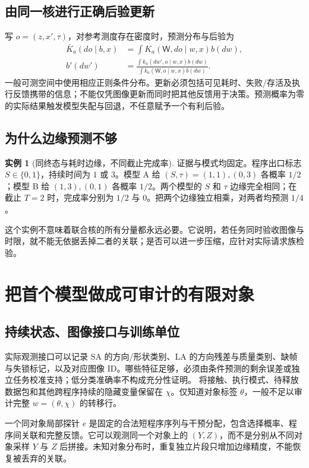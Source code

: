 \documentclass[11pt,a4paper,fontset=fandol]{ctexart}
\theoremstyle{definition}
\newtheorem{example}[theorem]{实例}
\theoremstyle{remark}
\numberwithin{equation}{section}
\begin{document}
\subsection{由同一核进行正确后验更新}
写 $o=(z,x',\tau)$，对参考测度存在密度时，预测分布与后验为
\begin{align}
 \bar K_a(do\mid b,x)&=\int K_a(\mathsf W,do\mid w,x)b(dw),\label{eq:predictive}\\
 b'(dw')&=\frac{\int k_a(dw',o\mid w,x)b(dw)}{\int k_a(\mathsf W,o\mid w,x)b(dw)}.
 \label{eq:bayes}
\end{align}
一般可测空间中使用相应正则条件分布。更新必须包括可见耗时、失败/存活及执行反馈携带的信息；不能仅凭图像更新而同时把其他反馈用于决策。预测概率为零的实际结果触发模型失配与回退，不任意赋予一个有利后验。

\subsection{为什么边缘预测不够}
\begin{example}[同终态与耗时边缘，不同截止完成率]
\label{ex:marginal}
证据与模式均固定。程序出口标志 $S\in\{0,1\}$，持续时间为 $1$ 或 $3$。模型 A 给 $(S,\tau)=(1,1),(0,3)$ 各概率 $1/2$；模型 B 给 $(1,3),(0,1)$ 各概率 $1/2$。两个模型的 $S$ 和 $\tau$ 边缘完全相同；在截止 $T=2$ 时，完成率分别为 $1/2$ 与 $0$。把两个边缘独立相乘，对两者均预测 $1/4$。
\end{example}
这个实例不意味着联合核的所有分量都永远必要。它说明，若任务同时验收图像与时限，就不能无依据丢掉二者的关联；是否可以进一步压缩，应针对实际请求族检验。


\section{把首个模型做成可审计的有限对象}
\label{sec:finite}
\subsection{持续状态、图像接口与训练单位}
实际观测接口可以记录 SA 的方向/形状类别、LA 的方向残差与质量类别、缺帧与失锁标记，以及对应图像 ID。哪些特征足够，必须由条件预测的剩余误差或独立任务校准支持；低分类准确率不构成充分性证明。
将接触、执行模式、待释放数据包和其他跨程序持续的隐藏变量保留在 $\chi$。仅知道对象标签 $\theta$，一般不足以审计完整 $w=(\theta,\chi)$ 的转移行。

一个同对象局部探针 $e$ 是固定的合法短程序序列与干预分配，包含选择概率、程序间关联和完整反馈。它可以观测同一个对象上的 $(Y,Z)$，而不是分别从不同对象采样 $Y$ 与 $Z$ 后拼接。未知对象分布时，重复独立片段只增加边缘精度，不能恢复被丢弃的关联。
\end{document}
